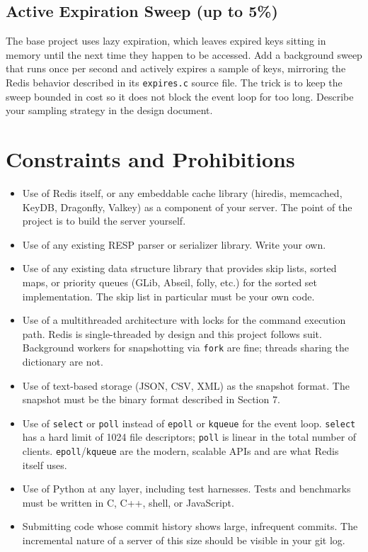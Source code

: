 \documentclass[11pt,a4paper]{article}
\begin{document}
\subsection{Active Expiration Sweep (up to 5\%)}
The base project uses lazy expiration, which leaves expired keys sitting in memory until the next time they happen to be accessed. Add a background sweep that runs once per second and actively expires a sample of keys, mirroring the Redis behavior described in its \texttt{expires.c} source file. The trick is to keep the sweep bounded in cost so it does not block the event loop for too long. Describe your sampling strategy in the design document.

\section{Constraints and Prohibitions}

\begin{notebox}
\begin{itemize}
\item Use of Redis itself, or any embeddable cache library (hiredis, memcached, KeyDB, Dragonfly, Valkey) as a component of your server. The point of the project is to build the server yourself.

\item Use of any existing RESP parser or serializer library. Write your own.

\item Use of any existing data structure library that provides skip lists, sorted maps, or priority queues (GLib, Abseil, folly, etc.) for the sorted set implementation. The skip list in particular must be your own code.

\item Use of a multithreaded architecture with locks for the command execution path. Redis is single-threaded by design and this project follows suit. Background workers for snapshotting via \texttt{fork} are fine; threads sharing the dictionary are not.

\item Use of text-based storage (JSON, CSV, XML) as the snapshot format. The snapshot must be the binary format described in Section 7.

\item Use of \texttt{select} or \texttt{poll} instead of \texttt{epoll} or \texttt{kqueue} for the event loop. \texttt{select} has a hard limit of 1024 file descriptors; \texttt{poll} is linear in the total number of clients. \texttt{epoll}/\texttt{kqueue} are the modern, scalable APIs and are what Redis itself uses.

\item Use of Python at any layer, including test harnesses. Tests and benchmarks must be written in C, C++, shell, or JavaScript.

\item Submitting code whose commit history shows large, infrequent commits. The incremental nature of a server of this size should be visible in your git log.
\end{itemize}
\end{notebox}
\end{document}
